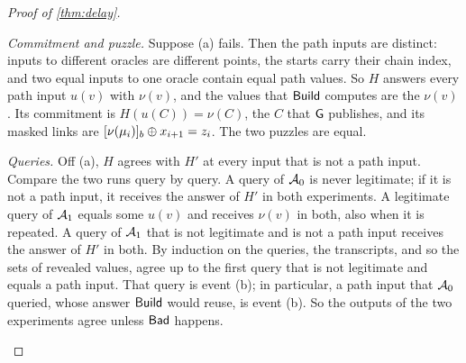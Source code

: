 \begin{proof}[Proof of \cref{thm:delay}]
\begin{claimproof}
\emph{Commitment and puzzle.} Suppose (a) fails. Then the path inputs are distinct: inputs to different oracles are different points, the starts carry their chain index, and two equal inputs to one oracle contain equal path values. So $H$ answers every path input $u(v)$ with $\nu(v)$, and the values that $\mathsf{Build}$ computes are the $\nu(v)$. Its commitment is $H(u(C)) = \nu(C)$, the $C$ that $\mathsf{G}$ publishes, and its masked links are $[\nu(\mu_i)]_{b} \oplus x_{i+1} = z_i$. The two puzzles are equal.

\emph{Queries.} Off (a), $H$ agrees with $H'$ at every input that is not a path input. Compare the two runs query by query. A query of $\mathcal{A}_0$ is never legitimate; if it is not a path input, it receives the answer of $H'$ in both experiments. A legitimate query of $\mathcal{A}_1$ equals some $u(v)$ and receives $\nu(v)$ in both, also when it is repeated. A query of $\mathcal{A}_1$ that is not legitimate and is not a path input receives the answer of $H'$ in both. By induction on the queries, the transcripts, and so the sets of revealed values, agree up to the first query that is not legitimate and equals a path input. That query is event (b); in particular, a path input that $\mathcal{A}_0$ queried, whose answer $\mathsf{Build}$ would reuse, is event (b). So the outputs of the two experiments agree unless $\mathsf{Bad}$ happens.
\end{claimproof}


\end{proof}
